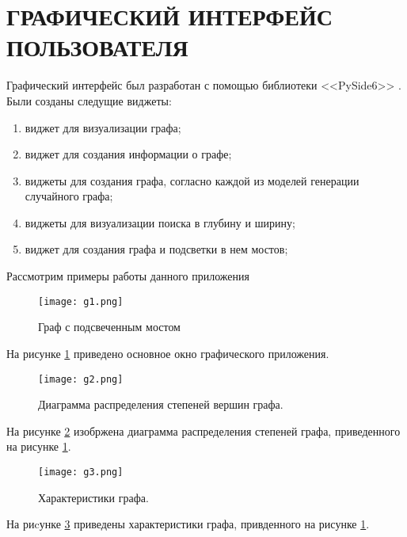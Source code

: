 \section{ГРАФИЧЕСКИЙ ИНТЕРФЕЙС ПОЛЬЗОВАТЕЛЯ}
Графический интерфейс был разработан с помощью библиотеки <<PySide6>> \cite{pyside}. 
Были созданы следущие виджеты:
\begin{enumerate}
    \item виджет для визуализации графа;
    \item виджет для создания информации о графе;
    \item виджеты для создания графа, согласно каждой
        из моделей генерации случайного графа;
    \item виджеты для визуализации поиска в глубину и ширину;
    \item виджет для создания графа и подсветки в нем мостов;
\end{enumerate}

Рассмотрим примеры работы данного приложения
\begin{figure}[H] 
    \texttt{[image: g1.png]}
    \caption{Граф с подсвеченным мостом}
    \label{gui_1}
\end{figure} 
На рисунке \ref{gui_1} приведено основное окно графического приложения.
\begin{figure}[H] 
    \texttt{[image: g2.png]} 
    \caption{Диаграмма распределения степеней вершин графа.}
    \label{gui_2}
\end{figure} 
На рисунке \ref{gui_2} изобржена диаграмма распределения
степеней графа, приведенного на рисунке \ref{gui_1}.
\begin{figure}[H] 
    \texttt{[image: g3.png]} 
    \caption{Характеристики графа.}
    \label{gui_3}
\end{figure} 
На риcунке \ref{gui_3} приведены характеристики
графа, привденного на рисунке \ref{gui_1}.


